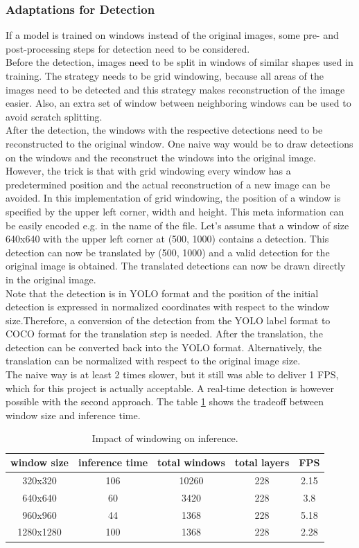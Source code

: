 \subsubsection{Adaptations for Detection}
If a model is trained on windows instead of the original images, some pre- and post-processing steps for detection need to be considered. \\
Before the detection, images need to be split in windows of similar shapes used in training. The strategy needs to be grid windowing, because all areas of the images need to be detected and this strategy makes reconstruction of the image easier. Also, an extra set of window between neighboring windows can be used to avoid scratch splitting. \\
After the detection, the windows with the respective detections need to be reconstructed to the original window. One naive way would be to draw detections on the windows and the reconstruct the windows into the original image. However, the trick is that with grid windowing every window has a predetermined position and the actual reconstruction of a new image can be avoided. In this implementation of grid windowing, the position of a window is specified by the upper left corner, width and height. This meta information can be easily encoded e.g. in the name of the file. Let's assume that a window of size 640x640 with the upper left corner at (500, 1000) contains a detection. This detection can now be translated by (500, 1000) and a valid detection for the original image is obtained. The translated detections can now be drawn directly in the original image.\\
Note that the detection is in YOLO format and the position of the initial detection is expressed in normalized coordinates with respect to the window size.Therefore, a conversion of the detection from the YOLO label format to COCO format \cite{coco_site} for the translation step is needed. After the translation, the detection can be converted back into the YOLO format.  Alternatively, the translation can be normalized with respect to the original image size.\\
The naive way is at least 2 times slower, but it still was able to deliver 1 FPS, which for this project is actually acceptable. A real-time detection is however possible with the second approach. The table \ref{impl:win_inference} shows the tradeoff between window size and inference time. \\

\begin{table}
\centering
\begin{tabular}{ ||c|c|c|c|c||}
\hline
window size & inference time & total windows & total layers & FPS\\ [0.5ex]
\hline\hline
320x320 & 106 & 10260 & 228 & 2.15 \\
640x640 & 60 & 3420 & 228 & 3.8 \\
960x960 & 44 & 1368  & 228 & 5.18 \\
1280x1280 & 100 & 1368 & 228 & 2.28 \\
\hline
\end{tabular}
\caption{Impact of windowing on inference.}
\label{impl:win_inference}
\end{table}

